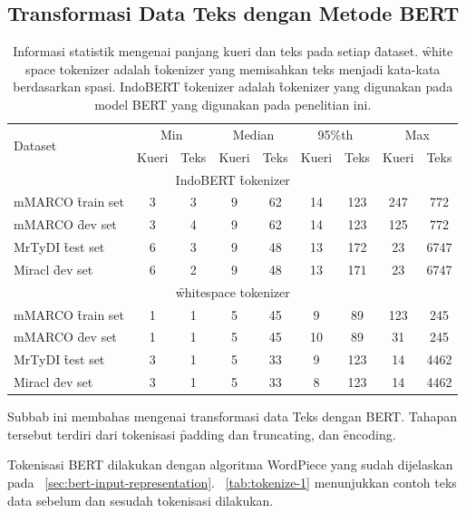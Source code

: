 \subsection{Transformasi Data Teks dengan Metode BERT}
\begin{table}[!ht]
    \centering
    \caption{Informasi statistik mengenai panjang kueri dan teks pada setiap \f{dataset}. \f{white space tokenizer} adalah \f{tokenizer} yang memisahkan teks menjadi kata-kata berdasarkan spasi. IndoBERT \f{tokenizer} adalah \f{tokenizer} yang digunakan pada model BERT yang digunakan pada penelitian ini.}
    \label{tab:dataset-token-statistics}
    \begin{tabular}{lcccccccc}
        \multirow{2}{*}{Dataset} & \multicolumn{2}{c}{Min} & \multicolumn{2}{c}{Median} & \multicolumn{2}{c}{95\%th} & \multicolumn{2}{c}{Max} \\
        \cline{2-9}
        & Kueri & Teks & Kueri & Teks & Kueri & Teks & Kueri & Teks \\
        \multicolumn{9}{c}{IndoBERT \f{tokenizer}} \\
        \hline
        mMARCO \f{train set} & 3 & 3 & 9 & 62 & 14 & 123 & 247 & 772 \\
        mMARCO \f{dev set}   & 3 & 4 & 9 & 62 & 14 & 123 & 125 & 772 \\
        MrTyDI \f{test set}  & 6 & 3 & 9 & 48 & 13 & 172 & 23 & 6747 \\
        Miracl \f{dev set}   & 6 & 2 & 9 & 48 & 13 & 171 & 23 & 6747 \\
        \hline
        \multicolumn{9}{c}{\f{whitespace tokenizer}} \\
        mMARCO \f{train set} & 1 & 1 & 5 & 45 & 9 & 89 & 123 & 245 \\
        mMARCO \f{dev set}   & 1 & 1 & 5 & 45 & 10 & 89 & 31 & 245 \\
        MrTyDI \f{test set}  & 3 & 1 & 5 & 33 & 9 & 123 & 14 & 4462 \\
        Miracl \f{dev set}   & 3 & 1 & 5 & 33 & 8 & 123 & 14 & 4462 \\
        \hline
    \end{tabular}
\end{table}

Subbab ini membahas mengenai transformasi data Teks dengan BERT. Tahapan tersebut terdiri dari tokenisasi \f{padding} dan \f{truncating}, dan \f{encoding}.

Tokenisasi BERT dilakukan dengan algoritma WordPiece yang sudah dijelaskan pada \sect~\ref{sec:bert-input-representation}. \tab~\ref{tab:tokenize-1} menunjukkan contoh teks data sebelum dan sesudah tokenisasi dilakukan.

